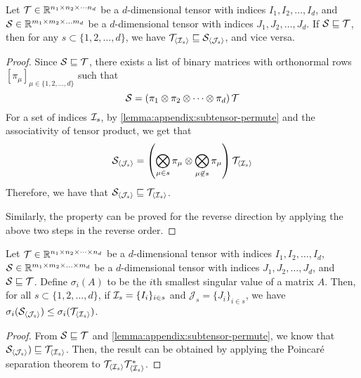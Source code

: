 \begin{lemma}\label{lemma:appendix:subtensor-reshape}
Let $\mathcal{T} \in \mathbb{R}^{n_1 \times n_2 \times \cdots n_d}$ be a $d$-dimensional tensor with indices $I_1, I_2, \ldots, I_d$, and $\mathcal{S} \in \mathbb{R}^{m_1 \times m_2 \times \ldots m_d}$ be a $d$-dimensional tensor with indices $J_1, J_2, \ldots, J_d$.
%
If $\mathcal{S} \sqsubseteq \mathcal{T}$, then for any $s \subset \{1,2,\ldots, d\}$, we have $\mathcal{T}_{\langle\mathcal{I}_s\rangle} \sqsubseteq \mathcal{S}_{\langle\mathcal{J}_s\rangle}$, and vice versa.
\end{lemma}
\begin{proof}
Since $\mathcal{S} \sqsubseteq \mathcal{T}$, there exists a list of binary matrices with orthonormal rows $[\pi_\mu]_{\mu \in \{1,2,\ldots, d\}}$ such that 
$$\mathcal{S} = \left(\pi_{1} \otimes \pi_{2} \otimes \cdots \otimes \pi_{d}\right)\mathcal{T}$$
%
For a set of indices $\mathcal{I}_s$, by \cref{lemma:appendix:subtensor-permute} and the associativity of tensor product, we get that
$$
\mathcal{S}_{\langle\mathcal{J}_s\rangle} = \left(\bigotimes_{\mu \in s} \pi_\mu \otimes \bigotimes_{\mu \not\in s}\pi_\mu\right)\mathcal{T}_{\langle\mathcal{I}_s\rangle}
$$
%
Therefore, we have that $\mathcal{S}_{\langle\mathcal{J}_s\rangle} \sqsubseteq \mathcal{T}_{\langle\mathcal{I}_s\rangle}$.

Similarly, the property can be proved for the reverse direction by applying the above two steps in the reverse order.
\end{proof}

\begin{lemma}\label{lemma:appendix:subtensor}
Let $\mathcal{T} \in \mathbb{R}^{n_1 \times n_2 \times \cdots \times n_d}$ be a $d$-dimensional tensor with indices $I_1, I_2, \ldots, I_d$, $\mathcal{S}  \in \mathbb{R}^{m_1 \times m_2 \times \ldots \times m_d}$ be a $d$-dimensional tensor with indices $J_1, J_2, \ldots, J_d$, and $\mathcal{S} \sqsubseteq \mathcal{T}$. Define $\sigma_i(A)$ to be the $i$th smallest singular value of a matrix $A$. Then, for all $s \subset \{1, 2, \ldots, d\}$, if $\mathcal{I}_s = \{I_i\}_{i \in s}$ and $\mathcal{J}_s = \{J_i\}_{i \in s}$, we have $\sigma_i(\mathcal{S}_{\langle\mathcal{J}_s\rangle}) \leq \sigma_i(\mathcal{T}_{\langle\mathcal{I}_s\rangle})$.
\end{lemma}
\begin{proof}
From $\mathcal{S} \sqsubseteq \mathcal{T}$ and \cref{lemma:appendix:subtensor-permute}, we know that $\mathcal{S}_{\langle\mathcal{J}_s\rangle}) \sqsubseteq \mathcal{T}_{\langle\mathcal{I}_s\rangle}$. Then, the result can be obtained by applying the Poincar\'e separation theorem to $\mathcal{T}_{\langle\mathcal{I}_s\rangle}\mathcal{T}_{\langle\mathcal{I}_s\rangle}^{*}$.
\end{proof}

